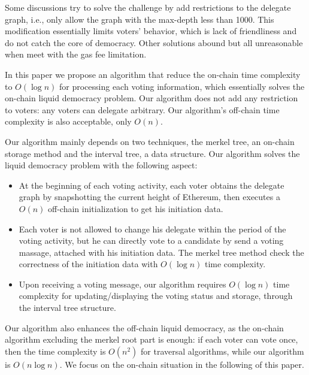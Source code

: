 Some discussions try to solve the challenge by add restrictions to the delegate graph, i.e., only allow the graph with the max-depth less than 1000. This modification essentially limits voters' behavior, which is lack of friendliness and do not catch the core of democracy. Other solutions abound but all unreasonable when meet with the gas fee limitation. 

In this paper we propose an algorithm that reduce the on-chain time complexity to $O(\log n)$ for processing each voting information, which essentially solves the on-chain liquid democracy problem. Our algorithm does not add any restriction to voters: any voters can delegate arbitrary. Our algorithm's off-chain time complexity is also acceptable, only $O(n)$. 

Our algorithm mainly depends on two techniques, the merkel tree, an on-chain storage method and the interval tree, a data structure. Our algorithm solves the liquid democracy  problem with the following aspect: 
\begin{itemize}
\item At the beginning of each voting activity, each voter obtains the delegate graph by snapshotting the current height of Ethereum, then executes a $O(n)$ off-chain initialization to get his initiation data.  
\item  Each voter is not allowed to change his delegate within the period of the voting activity, but he can directly vote to a candidate by send a voting massage, attached with his initiation data. The merkel tree method check the correctness of the initiation data with $O(\log n)$ time complexity. 
\item Upon receiving a voting message, our algorithm requires $O(\log n)$ time complexity for updating/displaying the voting status and storage, through the interval tree structure. 
\end{itemize}

Our algorithm also enhances the off-chain liquid democracy, as the on-chain algorithm excluding the merkel root part is enough: if each voter can vote once, then the time complexity is $O(n^2)$ for traversal algorithms, while our algorithm is $O(n\log n)$. We focus on the on-chain situation in the following of this paper. 
